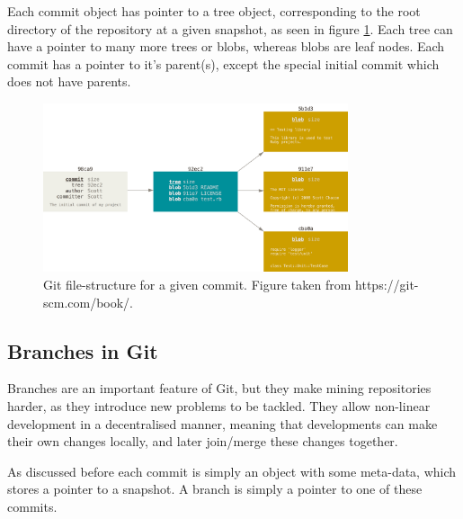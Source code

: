\documentclass[12pt,twoside,notitlepage]{report}
\begin{document}
Each commit object has pointer to a tree object, corresponding to the root directory of the repository at a given snapshot, as seen in figure \ref{commit-and-tree_git}. Each tree can have a pointer to many more trees or blobs, whereas blobs are leaf nodes. Each commit has a pointer to it's parent(s), except the special initial commit which does not have parents.
\begin{figure}[h]
\includegraphics[width=0.8\textwidth]{commit-and-tree_git.png}
\centering
\captionsetup{width=0.8\textwidth}
\caption[Git file-structure for a given commit.]{Git file-structure for a given commit. Figure taken from https://git-scm.com/book/.}
\label{commit-and-tree_git}

\end{figure}
\subsection{Branches in Git}\label{gitbranches}
Branches are an important feature of Git, but they make mining repositories harder, as they introduce new problems to be tackled. They allow non-linear development in a decentralised manner, meaning that developments can make their own changes locally, and later join/merge these changes together. 

As discussed before each commit is simply an object with some meta-data, which stores a pointer to a snapshot. A branch is simply a pointer to one of these commits.
\end{document}
